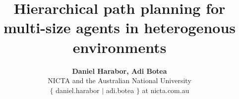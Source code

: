 \documentclass[conference]{IEEEtran}
\begin{document}
\title{Hierarchical path planning for multi-size agents in heterogenous environments}
\author{\textbf{Daniel Harabor, Adi Botea} \\ NICTA and the Australian National University \\ $\lbrace$ daniel.harabor $|$ adi.botea $\rbrace$ at nicta.com.au}

\maketitle









 









%
%
%
%
\end{document}

